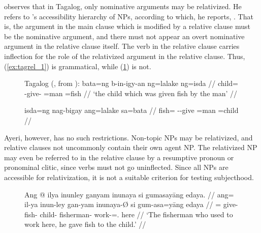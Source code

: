\citet{kroeger1991} observes that in Tagalog, only nominative arguments may be
relativized. He refers to \citet{keenancomrie1977}'s accessibility hierarchy of
NPs, according to which, he reports, . That is, the argument in the main clause which is modified by a
relative clause must be the nominative argument, and there must not appear an
overt nominative argument in the relative clause itself. The verb in the
relative clause carries inflection for the role of the relativized argument in
the relative clause. Thus, (\ref{ex:tagrel_1}) is grammatical, while 
(\ref{ex:tagrel_2}) is not.

\begin{figure}[h]
\pex\label{ex:tagrel}%
Tagalog (\cite[24]{kroeger1991}, from \cite[141--142]{foleyvanvalin1984}):
\a\label{ex:tagrel_1}\begingl
	\gla bata=ng b-in-igy-an ng=lalake ng=isda //
	\glb child=\Lnk{} \Pfv{}-give-\Dv{} \Gen{}=man \Gen{}=fish //
	\glft `the child which was given fish by the man' //
\endgl

\a\label{ex:tagrel_2}\ljudge*\begingl
	\gla isda=ng nag-bigay ang=lalake sa=bata //
	\glb fish=\Lnk{} \Av{}-\Pfv{}-give \Nom{}=man \Dat{}=child //
\endgl
\xe
\end{figure}

Ayeri, however, has no such restrictions. Non-topic NPs may be relativized, and
relative clauses not uncommonly contain their own agent NP. The relativized NP
may even be referred to in the relative clause by a resumptive pronoun or
pronominal clitic, since verbs must not go uninflected. Since all NPs are
accessible for relativization, it is not a suitable criterion for testing
subjecthood.

\begin{figure}[h]
\ex\label{ex:ayrrel}\begingl
	\gla Ang @ ilya inunley ganyam inunaya si gumasayāng edaya. //
	\glb ang= il-ya inun-ley gan-yam inunaya-Ø si gum-asa=yāng edaya //
	\glc \AgtT{}= give-\TsgM{} fish-\PargI{} child-\Dat{} fisherman-\Top{} 
		\Rel{} work-\Hab{}=\TsgM{}.\Aarg{} here //
	\glft `The fisherman who used to work here, he gave fish to the child.' //
\endgl\xe
\end{figure}

